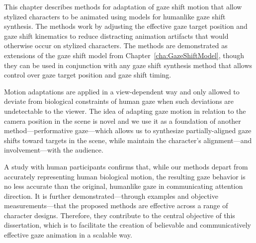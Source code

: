 This chapter describes methods for adaptation of gaze shift motion that allow stylized characters to be animated using models for humanlike gaze shift synthesis. The methods work by adjusting the effective gaze target position and gaze shift kinematics to reduce distracting animation artifacts that would otherwise occur on stylized characters. The methods are demonstrated as extensions of the gaze shift model from Chapter~\ref{cha:GazeShiftModel}, though they can be used in conjunction with any gaze shift synthesis method that allows control over gaze target position and gaze shift timing.

Motion adaptations are applied in a view-dependent way and only allowed to deviate from biological constraints of human gaze when such deviations are undetectable to the viewer. The idea of adapting gaze motion in relation to the camera position in the scene is novel and we use it as a foundation of another method---performative gaze---which allows us to synthesize partially-aligned gaze shifts toward targets in the scene, while maintain the character's alignment---and involvement---with the audience.

A study with human participants confirms that, while our methods depart from accurately representing human biological motion, the resulting gaze behavior is no less accurate than the original, humanlike gaze in communicating attention direction. It is further demonstrated---through examples and objective measurements---that the proposed methods are effective across a range of character designs. Therefore, they contribute to the central objective of this dissertation, which is to facilitate the creation of believable and communicatively effective gaze animation in a scalable way.

